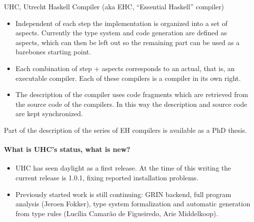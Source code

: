 \begin{hcarentry}{UHC, Utrecht Haskell Compiler (aka EHC, ``Essential Haskell'' compiler)}
\begin{itemize}
\item
   Independent of each step the implementation is organized into a set of aspects.
   Currently the type system and code generation are defined as aspects,
   which can then be left out so the remaining part can be used as a barebones starting point.

\item
   Each combination of step + aspects corresponds to an actual, that is, an executable compiler.
   Each of these compilers is a compiler in its own right.

\item
   The description of the compiler uses code fragments which are
   retrieved from the source code of the compilers.
   In this way the description and source code are kept synchronized.
\end{itemize}

Part of the description of the series of EH compilers is available
as a PhD thesis.

\paragraph{What is UHC's status, what is new?}
\begin{itemize}
\item
   UHC has seen daylight as a first release.
   At the time of this writing the current release is 1.0.1, fixing reported installation problems.
\item
   Previously started work is still continuing: GRIN backend, full program analysis (Jeroen Fokker),
   type system formalization and automatic generation from type rules
   (Luc\'ilia Camar\~ao de Figueiredo, Arie Middelkoop).
\end{itemize}


\end{hcarentry}
